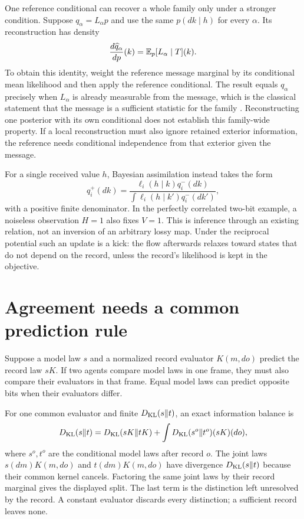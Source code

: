 One reference conditional can recover a whole family only under a stronger condition. Suppose $q_\alpha=L_\alpha p$ and use the same $p(dk\mid h)$ for every $\alpha$. Its reconstruction has density
\begin{equation}
\frac{d\widehat q_\alpha}{dp}(k)
=\mathbb E_p[L_\alpha\mid T](k).
\end{equation}
To obtain this identity, weight the reference message marginal by its conditional mean likelihood and then apply the reference conditional. The result equals $q_\alpha$ precisely when $L_\alpha$ is already measurable from the message, which is the classical statement that the message is a sufficient statistic for the family \citep{HalmosSavage1949}. Reconstructing one posterior with its own conditional does not establish this family-wide property. If a local reconstruction must also ignore retained exterior information, the reference needs conditional independence from that exterior given the message.

For a single received value $h$, Bayesian assimilation instead takes the form
\begin{equation}
q_i^+(dk)=\frac{\ell_i(h\mid k)q_i^-(dk)}{\int\ell_i(h\mid k')q_i^-(dk')},
\label{comp:eq-bayes-receiver}
\end{equation}
with a positive finite denominator. In the perfectly correlated two-bit example, a noiseless observation $H=1$ also fixes $V=1$. This is inference through an existing relation, not an inversion of an arbitrary lossy map. Under the reciprocal potential such an update is a kick: the flow afterwards relaxes toward states that do not depend on the record, unless the record's likelihood is kept in the objective.

\section{Agreement needs a common prediction rule}

Suppose a model law $s$ and a normalized record evaluator $K(m,do)$ predict the record law $sK$. If two agents compare model laws in one frame, they must also compare their evaluators in that frame. Equal model laws can predict opposite bits when their evaluators differ.

For one common evaluator and finite $D_{\mathrm{KL}}(s\Vert t)$, an exact information balance is
\begin{equation}
D_{\mathrm{KL}}(s\Vert t)
=D_{\mathrm{KL}}(sK\Vert tK)
+\int D_{\mathrm{KL}}(s^o\Vert t^o)(sK)(do),
\label{comp:eq-prediction-balance}
\end{equation}
where $s^o,t^o$ are the conditional model laws after record $o$. The joint laws $s(dm)K(m,do)$ and $t(dm)K(m,do)$ have divergence $D_{\mathrm{KL}}(s\Vert t)$ because their common kernel cancels. Factoring the same joint laws by their record marginal gives the displayed split. The last term is the distinction left unresolved by the record. A constant evaluator discards every distinction; a sufficient record leaves none.

